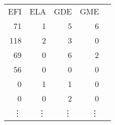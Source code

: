 \begin{tabular}{rrrrr}
EFI & ELA & GDE & {\color[HTML]{9B9B9B} GME}  \\
 71 &   1 &   5 &  {\color[HTML]{9B9B9B} 6}       \\
118 &   2 &   3 &  {\color[HTML]{9B9B9B} 0}       \\
 69 &   0 &   6 &   {\color[HTML]{9B9B9B} 2}    \\
 56 &   0 &   0 &  {\color[HTML]{9B9B9B} 0}    \\
  0 &   1 &   1 &   {\color[HTML]{9B9B9B} 0} \\
  0 &   0 &   2 &   {\color[HTML]{9B9B9B} 0}  \\
\vdots & \vdots & \vdots & \vdots  
\end{tabular}